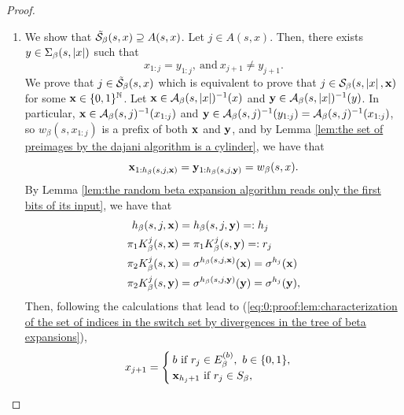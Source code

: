 \begin{proof}
\begin{enumerate}[label = (\alph*)]
        \begin{equation}
            x_{1:j} = y_{1:j}, \ \text{and} \ x_{j+1} \neq y_{j+1}.
        \end{equation}
        Then, $x \in A(s,x)$. This concludes the proof that $\tilde \SM_\beta(s,x) \subseteq  A(s,x)$.
        \item We show that $\tilde {\mathcal{S}}_\beta(s,x) \supseteq  A(s,x)$. Let $j \in A(s,x)$. Then, there exists $y \in \Sigma_\beta(s,\left| x \right|)$ such that 
        \begin{equation}
            x_{1:j} = y_{1:j}, \ \text{and} \ x_{j+1} \neq y_{j+1}.
        \end{equation}
        We prove that $j \in \tilde {\mathcal{S}}_\beta(s,x)$ which is equivalent to prove that $j \in \mathcal{S}_\beta(s,\left| x \right|, {\bf x})$ for some ${\bf x} \in \{0,1\}^{\mathbb{N}}$. Let ${\bf x} \in \mathcal{A}_\beta(s,\left| x \right|)^{-1}(x)$ and ${\bf y} \in \mathcal{A}_\beta(s,\left| x \right|)^{-1}(y)$. In particular, ${\bf x} \in \mathcal{A}_\beta(s,j)^{-1}(x_{1:j})$ and ${\bf y} \in \mathcal{A}_\beta(s,j)^{-1}(y_{1:j}) = \mathcal{A}_\beta(s,j)^{-1}(x_{1:j})$, so $w_\beta(s,x_{1:j})$ is a prefix of both ${\bf x}$ and ${\bf y}$, and by Lemma \ref{lem:the set of preimages by the dajani algorithm is a cylinder}, we have that 
        \begin{equation}
            {\bf x}_{1:h_\beta(s,j,{\bf x})} = {\bf y}_{1:h_\beta(s,j,{\bf y})} = w_\beta(s,x).
        \end{equation}
        By Lemma \ref{lem:the random beta expansion algorithm reads only the first bits of its input}, we have that
        \begin{align}
            h_\beta(s,j,{\bf x}) &= h_\beta(s,j,{\bf y}) =: h_j\\
            \pi_1 K_\beta^j(s,{\bf x}) &= \pi_1 K_\beta^j(s,{\bf y}) =: r_j\\
            \pi_2 K_\beta^j(s,{\bf x}) &= \sigma^{h_\beta(s,j,{\bf x})}({\bf x}) = \sigma^{h_j}({\bf x})\\
            \pi_2 K_\beta^j(s,{\bf y}) &= \sigma^{h_\beta(s,j,{\bf y})}({\bf y}) = \sigma^{h_j}({\bf y}),
        \end{align}
        Then, following the calculations that lead to (\ref{eq:0:proof:lem:characterization of the set of indices in the switch set by divergences in the tree of beta expansions}),
        \begin{align}
            x_{j+1} = \begin{cases}
                b \ \text{if} \ r_j \in E_\beta^{(b)}, \ b \in \{0,1\},\\
                \xf_{h_j+1} \ \text{if} \ r_j \in S_\beta,
            \end{cases}

\end{align}
\end{enumerate}
\end{proof}
